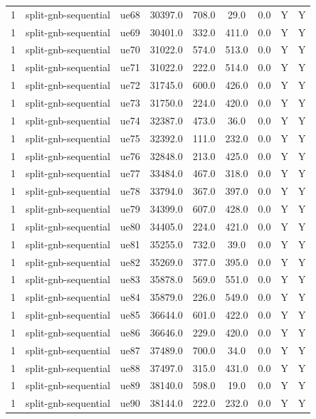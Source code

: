 \begin{table}[ht]
\begin{tabular}{|c|c|c|c|c|c|c|c|c|}
1 & split-gnb-sequential & ue68 & 30397.0 & 708.0 & 29.0 & 0.0 & Y & Y \\
1 & split-gnb-sequential & ue69 & 30401.0 & 332.0 & 411.0 & 0.0 & Y & Y \\
1 & split-gnb-sequential & ue70 & 31022.0 & 574.0 & 513.0 & 0.0 & Y & Y \\
1 & split-gnb-sequential & ue71 & 31022.0 & 222.0 & 514.0 & 0.0 & Y & Y \\
1 & split-gnb-sequential & ue72 & 31745.0 & 600.0 & 426.0 & 0.0 & Y & Y \\
1 & split-gnb-sequential & ue73 & 31750.0 & 224.0 & 420.0 & 0.0 & Y & Y \\
1 & split-gnb-sequential & ue74 & 32387.0 & 473.0 & 36.0 & 0.0 & Y & Y \\
1 & split-gnb-sequential & ue75 & 32392.0 & 111.0 & 232.0 & 0.0 & Y & Y \\
1 & split-gnb-sequential & ue76 & 32848.0 & 213.0 & 425.0 & 0.0 & Y & Y \\
1 & split-gnb-sequential & ue77 & 33484.0 & 467.0 & 318.0 & 0.0 & Y & Y \\
1 & split-gnb-sequential & ue78 & 33794.0 & 367.0 & 397.0 & 0.0 & Y & Y \\
1 & split-gnb-sequential & ue79 & 34399.0 & 607.0 & 428.0 & 0.0 & Y & Y \\
1 & split-gnb-sequential & ue80 & 34405.0 & 224.0 & 421.0 & 0.0 & Y & Y \\
1 & split-gnb-sequential & ue81 & 35255.0 & 732.0 & 39.0 & 0.0 & Y & Y \\
1 & split-gnb-sequential & ue82 & 35269.0 & 377.0 & 395.0 & 0.0 & Y & Y \\
1 & split-gnb-sequential & ue83 & 35878.0 & 569.0 & 551.0 & 0.0 & Y & Y \\
1 & split-gnb-sequential & ue84 & 35879.0 & 226.0 & 549.0 & 0.0 & Y & Y \\
1 & split-gnb-sequential & ue85 & 36644.0 & 601.0 & 422.0 & 0.0 & Y & Y \\
1 & split-gnb-sequential & ue86 & 36646.0 & 229.0 & 420.0 & 0.0 & Y & Y \\
1 & split-gnb-sequential & ue87 & 37489.0 & 700.0 & 34.0 & 0.0 & Y & Y \\
1 & split-gnb-sequential & ue88 & 37497.0 & 315.0 & 431.0 & 0.0 & Y & Y \\
1 & split-gnb-sequential & ue89 & 38140.0 & 598.0 & 19.0 & 0.0 & Y & Y \\
1 & split-gnb-sequential & ue90 & 38144.0 & 222.0 & 232.0 & 0.0 & Y & Y \\

\end{tabular}
\end{table}

